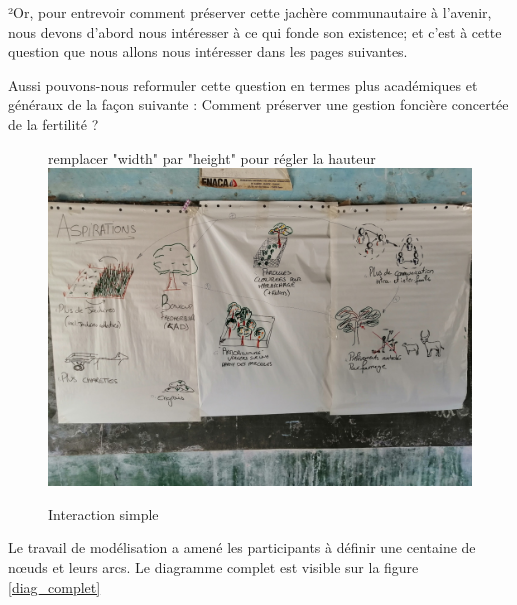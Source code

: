 ²Or, pour entrevoir comment préserver cette jachère communautaire à l'avenir, nous devons d'abord nous intéresser à ce qui fonde son existence; et c'est à cette question que nous allons nous intéresser dans les pages suivantes.


Aussi pouvons-nous reformuler cette question en termes plus académiques et généraux de la façon suivante :
Comment préserver une gestion foncière concertée de la fertilité ?

\begin{figure}
  \begin{center}
  remplacer "width" par "height" pour régler la hauteur
  \includegraphics[width=15cm]{img/aspiration_formulee.jpg}
  \end{center}
  \caption{Interaction simple }
  \label{aspiration}
\end{figure}

Le travail de modélisation a amené les participants à définir une centaine de nœuds et leurs arcs. Le diagramme complet est visible sur la figure \ref{diag_complet}


